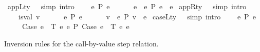 \begin{isabellebody}
{\isacharbar}{\kern0pt}\ appL{\isacharunderscore}{\kern0pt}ty\ \ \ {\isacharbrackleft}{\kern0pt}simp{\isacharcomma}{\kern0pt}\ intro{\isacharbrackright}{\kern0pt}{\isacharcolon}{\kern0pt}\isanewline
\ \ \ \ {\isachardoublequoteopen}e{}\ {\isacharminus}{\kern0pt}{\isachargreater}{\kern0pt}{\isacharbraceleft}{\kern0pt}P{\isacharbraceright}{\kern0pt}\ e{}{\isacharprime}{\kern0pt}\ {\isacharequal}{\kern0pt}{\isacharequal}{\kern0pt}{\isachargreater}{\kern0pt}\isanewline
\ \ \ \ \ e{}\ {\isasymcdot}\ e{}\ {\isacharminus}{\kern0pt}{\isachargreater}{\kern0pt}{\isacharbraceleft}{\kern0pt}P{\isacharbraceright}{\kern0pt}\ e{}{\isacharprime}{\kern0pt}\ {\isasymcdot}\ e{}{\isachardoublequoteclose}\isanewline
{\isacharbar}{\kern0pt}\ appR{\isacharunderscore}{\kern0pt}ty\ \ \ {\isacharbrackleft}{\kern0pt}simp{\isacharcomma}{\kern0pt}\ intro{\isacharbrackright}{\kern0pt}{\isacharcolon}{\kern0pt}\isanewline
\ \ \ \ {\isachardoublequoteopen}is{\isacharunderscore}{\kern0pt}val\ v\ {\isacharequal}{\kern0pt}{\isacharequal}{\kern0pt}{\isachargreater}{\kern0pt}\isanewline
\ \ \ \ \ e\ {\isacharminus}{\kern0pt}{\isachargreater}{\kern0pt}{\isacharbraceleft}{\kern0pt}P{\isacharbraceright}{\kern0pt}\ e{\isacharprime}{\kern0pt}\ {\isacharequal}{\kern0pt}{\isacharequal}{\kern0pt}{\isachargreater}{\kern0pt}\isanewline
\ \ \ \ \ v\ {\isasymcdot}\ e\ {\isacharminus}{\kern0pt}{\isachargreater}{\kern0pt}{\isacharbraceleft}{\kern0pt}P{\isacharbraceright}{\kern0pt}\ v\ {\isasymcdot}\ e{\isacharprime}{\kern0pt}{\isachardoublequoteclose}\isanewline
{\isacharbar}{\kern0pt}\ caseL{\isacharunderscore}{\kern0pt}ty\ \ \ {\isacharbrackleft}{\kern0pt}simp{\isacharcomma}{\kern0pt}\ intro{\isacharbrackright}{\kern0pt}{\isacharcolon}{\kern0pt}\isanewline
\ \ \ \ {\isachardoublequoteopen}e{}\ {\isacharminus}{\kern0pt}{\isachargreater}{\kern0pt}{\isacharbraceleft}{\kern0pt}P{\isacharbraceright}{\kern0pt}\ e{}{\isacharprime}{\kern0pt}\ {\isacharequal}{\kern0pt}{\isacharequal}{\kern0pt}{\isachargreater}{\kern0pt}\isanewline
\ \ \ \ \ Case\ e{}\ {\isasymGamma}\ T\ e{}\ e{}\ {\isacharminus}{\kern0pt}{\isachargreater}{\kern0pt}{\isacharbraceleft}{\kern0pt}P{\isacharbraceright}{\kern0pt}\ Case\ e{}{\isacharprime}{\kern0pt}\ {\isasymGamma}\ T\ e{}\ e{}{\isachardoublequoteclose}%
\begin{isamarkuptext}%
Inversion rules for the call-by-value step relation.%
\end{isamarkuptext}\isamarkuptrue%

\end{isabellebody}

